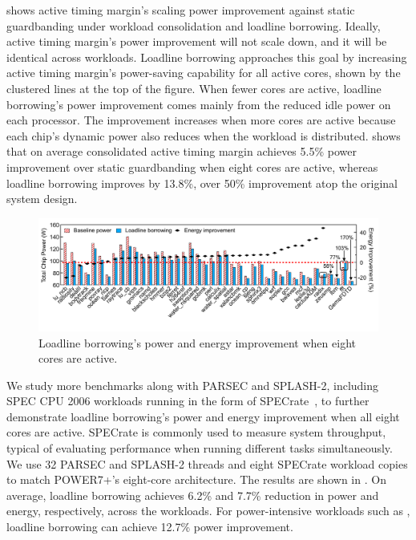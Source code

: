  shows active timing margin's scaling power improvement against static guardbanding under workload consolidation and loadline borrowing. Ideally, active timing margin's power improvement will not scale down, and it will be identical across workloads. Loadline borrowing approaches this goal by increasing active timing margin's power-saving capability for all active cores, shown by the clustered lines at the top of the figure. When fewer cores are active, loadline borrowing's power improvement comes mainly from the reduced idle power on each processor. The improvement increases when more cores are active because each chip's dynamic power also reduces when the workload is distributed.  shows that on average consolidated active timing margin achieves 5.5\% power improvement over static guardbanding when eight cores are active, whereas loadline borrowing improves by 13.8\%, over 50\% improvement atop the original system design.

\begin{figure}
  \centering
  \includegraphics[trim=0 0 0 0,clip,width=\linewidth]{graphs/voltage/split_benefits_all.pdf}
    \caption{Loadline borrowing's power and energy improvement when eight cores are active.}
    \label{fig:ll-borrow-8core-normal}
\end{figure}

We study more benchmarks along with PARSEC and SPLASH-2, including SPEC CPU 2006 workloads running in the form of SPECrate~\cite{SPECrate}, to further demonstrate loadline borrowing's power and energy improvement when all eight cores are active. SPECrate is commonly used to measure system throughput, typical of evaluating performance when running different tasks simultaneously. We use 32 PARSEC and SPLASH-2 threads and eight SPECrate workload copies to match POWER7+'s eight-core architecture. The results are shown in . On average, loadline borrowing achieves 6.2\% and 7.7\% reduction in power and energy, respectively, across the workloads. For power-intensive workloads such as , loadline borrowing can achieve 12.7\% power improvement. 

